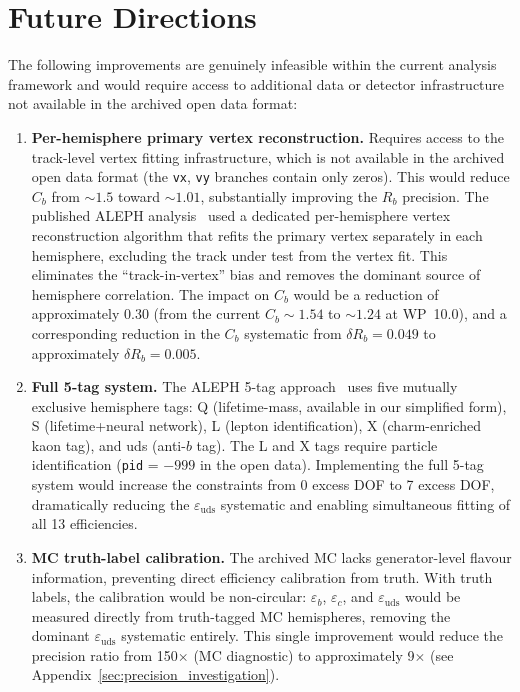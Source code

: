 \documentclass[11pt,a4paper]{article}
\begin{document}
\section{Future Directions}
\label{sec:future}

The following improvements are genuinely infeasible within the current analysis
framework and would require access to additional data or detector infrastructure
not available in the archived open data format:

\begin{enumerate}
\item \textbf{Per-hemisphere primary vertex reconstruction.} Requires access to the
track-level vertex fitting infrastructure, which is not available in the archived
open data format (the \texttt{vx}, \texttt{vy} branches contain only zeros). This
would reduce $C_b$ from $\sim 1.5$ toward $\sim 1.01$, substantially improving the
$R_b$ precision. The published ALEPH analysis~\cite{ALEPH:Rb:1996} used a dedicated
per-hemisphere vertex reconstruction algorithm that refits the primary vertex
separately in each hemisphere, excluding the track under test from the vertex fit.
This eliminates the ``track-in-vertex'' bias and removes the dominant source of
hemisphere correlation. The impact on $C_b$ would be a reduction of approximately
0.30 (from the current $C_b \sim 1.54$ to $\sim 1.24$ at WP~10.0), and a corresponding
reduction in the $C_b$ systematic from $\delta R_b = 0.049$ to approximately
$\delta R_b = 0.005$.

\item \textbf{Full 5-tag system.} The ALEPH 5-tag approach~\cite{ALEPH:Rb:1996}
uses five mutually exclusive hemisphere tags: Q (lifetime-mass, available in our
simplified form), S (lifetime+neural network), L (lepton identification), X
(charm-enriched kaon tag), and uds (anti-$b$ tag). The L and X tags require
particle identification (\texttt{pid} = $-999$ in the open data). Implementing the
full 5-tag system would increase the constraints from 0 excess DOF to 7 excess DOF,
dramatically reducing the $\varepsilon_\mathrm{uds}$ systematic and enabling
simultaneous fitting of all 13 efficiencies.

\item \textbf{MC truth-label calibration.} The archived MC lacks generator-level
flavour information, preventing direct efficiency calibration from truth. With truth
labels, the calibration would be non-circular: $\varepsilon_b$, $\varepsilon_c$, and
$\varepsilon_\mathrm{uds}$ would be measured directly from truth-tagged MC
hemispheres, removing the dominant $\varepsilon_\mathrm{uds}$ systematic entirely.
This single improvement would reduce the precision ratio from 150$\times$ (MC diagnostic) to
approximately 9$\times$ (see Appendix~\ref{sec:precision_investigation}).


\end{enumerate}
\end{document}
